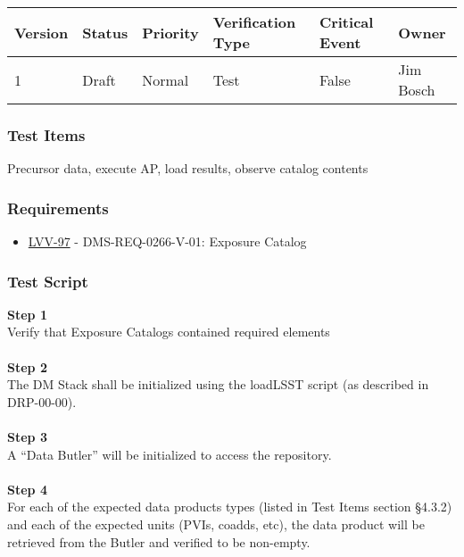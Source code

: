 \begin{longtable}[]{@{}llllll@{}}
\toprule
Version & Status & Priority & Verification Type & Critical Event &
Owner\tabularnewline
\midrule
\endhead
1 & Draft & Normal & Test & False & Jim Bosch\tabularnewline
\bottomrule
\end{longtable}

\hypertarget{test-items-24}{%
\subsubsection{Test Items}\label{test-items-24}}

Precursor data, execute AP, load results, observe catalog contents

\hypertarget{requirements-25}{%
\subsubsection{Requirements}\label{requirements-25}}

\begin{itemize}
\tightlist
\item
  \href{https://jira.lsstcorp.org/browse/LVV-97}{LVV-97} -
  DMS-REQ-0266-V-01: Exposure Catalog
\end{itemize}

\hypertarget{test-script-25}{%
\subsubsection{Test Script}\label{test-script-25}}

\textbf{Step 1}\\
Verify that Exposure Catalogs contained required elements\\
~\\
\textbf{Step 2}\\
The DM Stack shall be initialized using the loadLSST script (as
described in DRP-00-00).\\
~\\
\textbf{Step 3}\\
A ``Data Butler'' will be initialized to access the repository.\\
~\\
\textbf{Step 4}\\
For each of the expected data products types (listed in Test Items
section §4.3.2) and each of the expected units (PVIs, coadds, etc), the
data product will be retrieved from the Butler and verified to be
non-empty.\\
~\\
~\\
~\\

